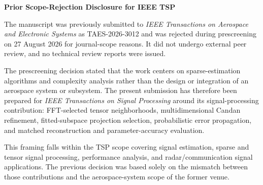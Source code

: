 \documentclass[11pt]{article}
\begin{document}
\begin{center}
{\Large\bfseries Prior Scope-Rejection Disclosure for IEEE TSP}
\end{center}

The manuscript was previously submitted to \emph{IEEE Transactions on Aerospace and Electronic Systems} as TAES-2026-3012 and was rejected during prescreening on 27 August 2026 for journal-scope reasons. It did not undergo external peer review, and no technical review reports were issued.

The prescreening decision stated that the work centers on sparse-estimation algorithms and complexity analysis rather than the design or integration of an aerospace system or subsystem. The present submission has therefore been prepared for \emph{IEEE Transactions on Signal Processing} around its signal-processing contribution: FFT-selected tensor neighborhoods, multidimensional Candan refinement, fitted-subspace projection selection, probabilistic error propagation, and matched reconstruction and parameter-accuracy evaluation.

This framing falls within the TSP scope covering signal estimation, sparse and tensor signal processing, performance analysis, and radar/communication signal applications. The previous decision was based solely on the mismatch between those contributions and the aerospace-system scope of the former venue.
\end{document}
